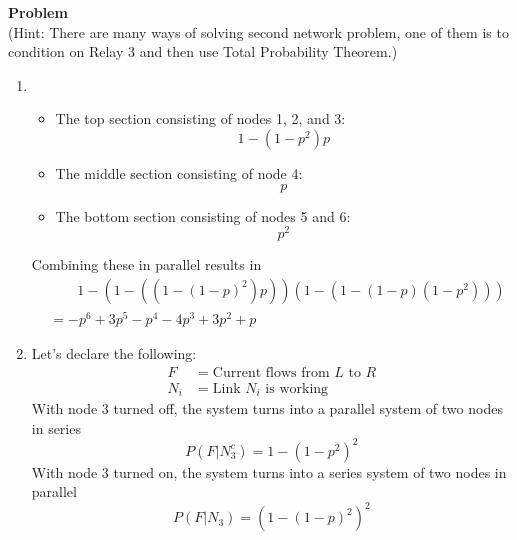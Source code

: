 \documentclass[12pt]{article}
\newenvironment{Ex}{\textbf{Problem}\vspace{.75em}\\}{}
\begin{document}
\begin{enumerate}
\begin{Ex}
      (Hint: There are many ways of solving second network problem,
      one of them is to condition on Relay 3 and then use Total
      Probability Theorem.)
      \begin{solution} \hfill
        \begin{enumerate}
        \item 
          \begin{itemize}
          \item The top section consisting of nodes 1, 2, and 3:
            $$ 1-(1-p^2)p $$
          \item The middle section consisting of node 4:
            $$ p $$
          \item The bottom section consisting of nodes 5 and 6:
            $$ p^2 $$
          \end{itemize}
          Combining these in parallel results in
          \begin{equation}
            \label{eq:9a-sol}
            \begin{aligned}
              &\quad\quad 1-(1-((1-(1-p)^2)p))(1-(1-(1-p)(1-p^2))) \\
              &= -p^6+3 p^5-p^4-4 p^3+3 p^2+p
            \end{aligned}
          \end{equation}
      \item Let's declare the following:
        \begin{equation}
          \label{eq:5-var-declaration}
          \begin{aligned}
            F &= \text{Current flows from }L\text{ to }R \\
            N_i &= \text{Link } N_i \text{ is working}
          \end{aligned}
        \end{equation}
        With node 3 turned off, the system turns into a parallel
        system of two nodes in series
          \begin{equation}
            \label{eq:9b-off}
            P(F | N_3^c) = 1-(1-p^2)^2
          \end{equation}
          With node 3 turned on, the system turns into a series system
          of two nodes in parallel
          \begin{equation}
            \label{eq:9b-on}
            P(F | N_3) = (1-(1-p)^2)^2
          \end{equation}

\end{enumerate}
\end{solution}
\end{Ex}
\end{enumerate}
\end{document}
